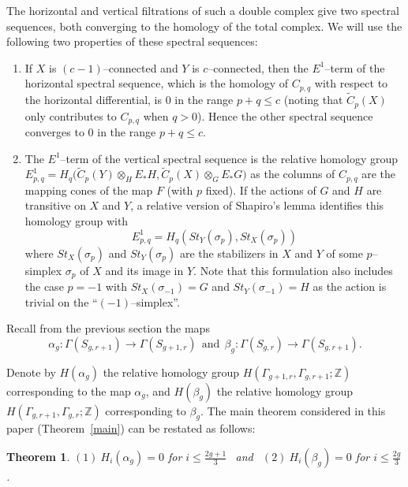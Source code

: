 \documentclass[10pt]{amsart}
\newtheorem{thm}{Theorem}[section]
\newcommand{\tC}{\tilde{C}}
\newcommand{\Z}{\mathbb{Z}}
\newcommand{\al}{\alpha}
\newcommand{\be}{\beta}
\newcommand{\Ga}{\Gamma}
\newcommand{\s}{\sigma}
\newcommand{\ot}{\otimes}
\begin{document}
The horizontal and vertical filtrations of such a double complex give two spectral sequences, both converging to the homology of the
total complex. 
We will use the following two properties of these spectral sequences: 
\begin{enumerate}[(SS1)]
\item If $X$ is $(c-1)$--connected and $Y$ is $c$--connected, then the $E^1$--term of the horizontal  spectral sequence, 
which is the homology of $C_{p,q}$
  with respect to the horizontal differential, is 0 in the range $p+q\le c$ (noting that $\tC_p(X)$ only contributes to $C_{p,q}$ when
  $q>0$).  
Hence the other spectral sequence converges to 0 in the range $p+q\le c$. 

\item The $E^1$--term of the vertical spectral sequence is the relative homology group 
$E^1_{p,q}=H_q\big(\tC_p(Y)\ot_HE_*H,\tC_p(X)\ot_GE_*G\big)$ as the columns of $C_{p,q}$ are the mapping cones of the map $F$ (with $p$
fixed). 
If the actions of $G$ and $H$ are transitive on $X$ and $Y$, 
a relative version of Shapiro's lemma  identifies this homology group with 
$$E^1_{p,q}=H_q(St_Y(\s_p),St_X(\s_p))$$ 
where $St_X(\s_p)$ and $St_Y(\s_p)$ are the stabilizers in $X$ and $Y$ of some $p$--simplex $\s_p$ of $X$ and its image in $Y$. Note
that this formulation also includes the case $p=-1$ with $St_X(\s_{-1})=G$ and $St_Y(\s_{-1})=H$ as the action is trivial on the
``$(-1)$--simplex''. 
\end{enumerate}



\medskip

Recall from the previous section the maps 
$$\al_g\colon \Ga(S_{g,r+1})\to \Ga(S_{g+1,r}) \ \ \textrm{and}\ \  \be_g\colon \Ga(S_{g,r})\to \Ga(S_{g,r+1}).$$


Denote by $H(\al_g)$ the relative homology group $H(\Ga_{g+1,r},\Ga_{g,r+1};\Z)$ corresponding to the map $\al_g$, and 
$H(\beta_g)$ the relative homology group $H(\Ga_{g,r+1},\Ga_{g,r};\Z)$ corresponding to $\be_g$. 
The main theorem considered in this paper (Theorem~\ref{main}) can be restated as follows:  

\begin{thm}
$(1)\ H_i(\al_g)=0$ for $i\le\frac{2g+1}{3}\ \ $ and  $\ \ (2) \ H_i(\beta_g)=0$ for $i\le \frac{2g}{3}$. 
\end{thm}
\end{document}
